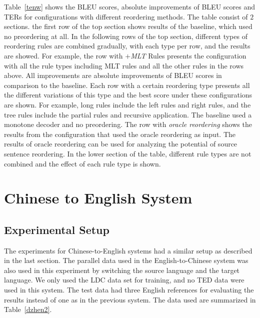 Table~\ref{tenw} shows the \ac{BLEU} scores, absolute improvements of \ac{BLEU} scores and \ac{TER}s for configurations with different reordering methods. The table consist of $2$ sections. the first row of the top section shows results of the baseline, which used no preordering at all. In the following rows of the top section, different types of reordering rules are combined gradually, with each type per row, and the results are showed. For example, the row with \emph{$+$MLT} Rules presents the configuration with all the rule types including \ac{MLT} rules and all the other rules in the rows above. All improvements are absolute improvements of \ac{BLEU} scores in comparison to the baseline. Each row with a certain reordering type presents all the different variations of this type and the best score under these configurations are shown. For example, long rules include the left rules and right rules, and the tree rules include the partial rules and recursive application. The baseline used a monotone decoder and no preordering. The row with \emph{oracle reordering} shows the results from the configuration that used the oracle reordering as input. The results of oracle reordering can be used for analyzing the potential of source sentence reordering. In the lower section of the table, different rule types are not combined and the effect of each rule type is shown. %



\section{Chinese to English System}
\label{ch:Evaluation:sec:zhen2}


\subsection{Experimental Setup}

The experiments for Chinese-to-English systems had a similar setup as described in the last section. The parallel data used in the English-to-Chinese system was also used in this experiment by switching the source language and the target language. We only used the \acs{LDC} data set for training, and no \acs{TED} data were used in this system. The test data had three English references for evaluating the results instead of one as in the previous system. The data used are summarized in Table~\ref{dzhen2}.


